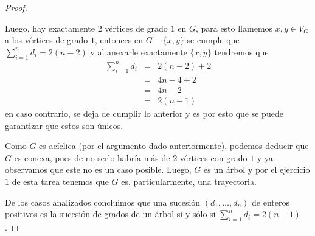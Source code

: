 \documentclass{article}
\begin{document}
\begin{enumerate}
\begin{proof}
\begin{itemize}
        Luego, hay exactamente $2$ v\'ertices de grado $1$ en $G$, para esto
        llamemos $x, y \in V_G$ a los v\'ertices de grado $1$, entonces en
        $G -\{x, y\}$ se cumple que $\sum_{i=1}^n d_i = 2(n-2)$ y al anexarle
        exactamente $\{x, y\}$ tendremos que
        \begin{eqnarray*}
          \sum_{i=1}^n d_i &=& 2(n-2) + 2\\
          &=& 4n - 4 + 2\\
          &=& 4n - 2\\
          &=& 2(n - 1)
        \end{eqnarray*}
        en caso contrario, se deja de cumplir lo anterior y es por esto que
        se puede garantizar que estos son \'unicos.
        
        Como $G$ es ac\'iclica (por el argumento dado anteriormente), podemos
        deducir que $G$ es conexa, pues de no serlo habr\'ia m\'as de $2$
        v\'ertices con grado $1$ y ya observamos que este no es un caso posible.
        Luego, $G$ es un \'arbol y por el ejercicio $1$ de esta tarea tenemos
        que $G$ es, part\'icularmente, una trayectoria.
      \end{itemize}
      
      De los casos analizados concluimos que una sucesi\'on $(d_1, \dots,
      d_n)$ de enteros positivos es la sucesi\'on de grados de un \'arbol
      si y s\'olo si $\displaystyle \sum_{i=1}^n d_i = 2(n-1)$.
    \end{proof}
\end{enumerate}
\end{document}
